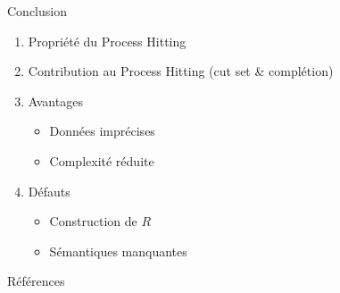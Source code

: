\documentclass[french]{beamer}
\begin{document}
\begin{frame}{Conclusion}
\begin{enumerate}
\item Propriété du Process Hitting\cite{Pauleve2014,pauleve2011modelisation,Pauleve2012}
\item Contribution au Process Hitting (cut set\cite{Pauleve2013} \& complétion)
\item Avantages
\begin{itemize}
\item Données imprécises
\item Complexité réduite
\end{itemize}
\item Défauts
\begin{itemize}
\item Construction de $R$
\item Sémantiques manquantes
\end{itemize}
\end{enumerate}
\end{frame}

\begin{frame}[allowframebreaks]{Références}
\renewcommand\refname{Références}




\end{frame}
\end{document}
